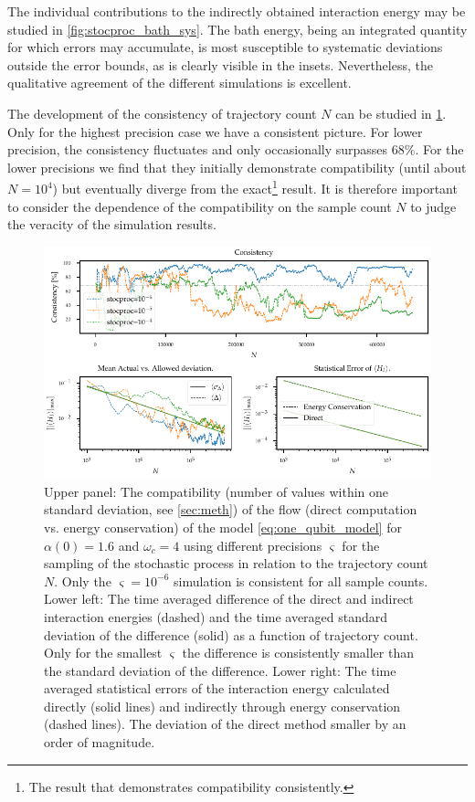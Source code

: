 The individual contributions to the indirectly obtained interaction
energy may be studied in \cref{fig:stocproc_bath_sys}. The bath
energy, being an integrated quantity for which errors may accumulate,
is most susceptible to systematic deviations outside the error bounds,
as is clearly visible in the insets. Nevertheless, the qualitative
agreement of the different simulations is excellent.

The development of the consistency of trajectory count \(N\) can be
studied in \cref{fig:stocproc_consistency_dev}. Only for the highest
precision case we have a consistent picture. For lower precision, the
consistency fluctuates and only occasionally surpasses \(68\%\). For
the lower precisions we find that they initially demonstrate
compatibility (until about \(N=10^4\)) but eventually diverge from the
exact\footnote{The result that demonstrates compatibility
  consistently.} result. It is therefore important to consider the
dependence of the compatibility on the sample count \(N\) to judge the
veracity of the simulation results.
\begin{figure}[htp]
  \centering
  \includegraphics{figs/one_bath_syst/stocproc_systematics_consistency}
  \caption{\label{fig:stocproc_consistency_dev} Upper panel: The
    compatibility (number of values within one standard deviation, see
    \cref{sec:meth}) of the flow (direct computation vs. energy
    conservation) of the model \cref{eq:one_qubit_model} for
    \(α(0)=1.6\) and \(ω_c=4\) using different precisions
    \(\varsigma\) for the sampling of the stochastic process in
    relation to the trajectory count \(N\). Only the
    \(\varsigma=10^{-6}\) simulation is consistent for all sample
    counts. Lower left: The time averaged difference of the direct and
    indirect interaction energies (dashed) and the time averaged
    standard deviation of the difference (solid) as a function of
    trajectory count. Only for the smallest \(\varsigma\) the
    difference is consistently smaller than the standard deviation of
    the difference. Lower right: The time averaged statistical errors
    of the interaction energy calculated directly (solid lines) and
    indirectly through energy conservation (dashed lines). The
    deviation of the direct method smaller by an order of magnitude.}
\end{figure}

